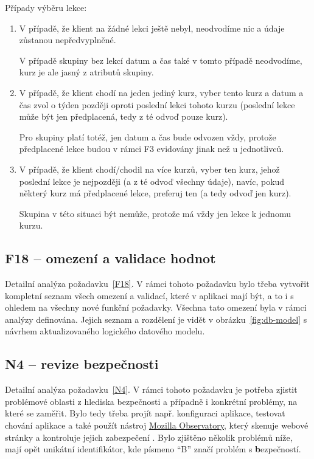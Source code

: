 Případy výběru lekce:
\begin{enumerate}
    \item V případě, že klient na žádné lekci ještě nebyl, neodvodíme nic a údaje zůstanou nepředvyplněné.
    
    V případě skupiny bez lekcí datum a čas také v tomto případě neodvodíme, kurz je ale jasný z atributů skupiny.
    \item V případě, že klient chodí na jeden jediný kurz, vyber tento kurz a datum a čas zvol o týden později oproti poslední lekci tohoto kurzu (poslední lekce může být jen předplacená, tedy z té odvoď pouze kurz).
    
    Pro skupiny platí totéž, jen datum a čas bude odvozen vždy, protože předplacené lekce budou v rámci F3 evidovány jinak než u jednotlivců.
    \item V případě, že klient chodí/chodil na více kurzů, vyber ten kurz, jehož poslední lekce je nejpozději (a z té odvoď všechny údaje), navíc, pokud některý kurz má předplacené lekce, preferuj ten (a tedy odvoď jen kurz).
    
    Skupina v této situaci být nemůže, protože má vždy jen lekce k jednomu kurzu.
\end{enumerate}

\subsection{F18 -- omezení a validace hodnot}\label{subsec:F18detail}

Detailní analýza požadavku~\ref{F18}.
V rámci tohoto požadavku bylo třeba vytvořit kompletní seznam všech omezení a validací, které v aplikaci mají být, a to i s ohledem na všechny nové funkční požadavky. Všechna tato omezení byla v rámci analýzy definována. Jejich seznam a rozdělení je vidět v obrázku~\ref{fig:db-model} s návrhem aktualizovaného logického datového modelu.

\subsection{N4 -- revize bezpečnosti}\label{subsec:N4detail}

Detailní analýza požadavku~\ref{N4}.
V rámci tohoto požadavku je potřeba zjistit problémové oblasti z hlediska bezpečnosti a případně i konkrétní problémy, na které se zaměřit. Bylo tedy třeba projít např. konfiguraci aplikace, testovat chování aplikace a také použít nástroj \href{https://observatory.mozilla.org/}{Mozilla Observatory}, který skenuje webové stránky a kontroluje jejich zabezpečení \cite{mozillaobservatory}. Bylo zjištěno několik problémů níže, mají opět unikátní identifikátor, kde písmeno \enquote{B} značí problém s \textbf{b}ezpečností.


